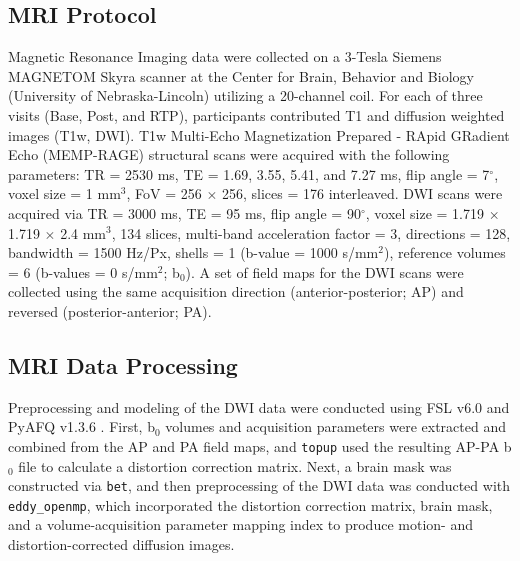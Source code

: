 \documentclass[12pt]{article}
\begin{document}


\subsection{MRI Protocol}
\label{ssec:meth-mri}
Magnetic Resonance Imaging data were collected on a 3-Tesla Siemens MAGNETOM Skyra scanner at the Center for Brain, Behavior and Biology (University of Nebraska-Lincoln) utilizing a 20-channel coil. For each of three visits (Base, Post, and RTP), participants contributed T1 and diffusion weighted images (T1w, DWI). T1w Multi-Echo Magnetization Prepared - RApid GRadient Echo (MEMP-RAGE) structural scans were acquired with the following parameters: TR = 2530 ms, TE = 1.69, 3.55, 5.41, and 7.27 ms, flip angle = 7$^{\circ}$, voxel size = 1 mm$^3$, FoV = 256 $\times$ 256, slices = 176 interleaved. DWI scans were acquired via TR = 3000 ms, TE = 95 ms, flip angle = 90$^{\circ}$, voxel size = 1.719 $\times$ 1.719 $\times$ 2.4 mm$^3$, 134 slices, multi-band acceleration factor = 3, directions = 128, bandwidth = 1500 Hz/Px, shells = 1 (b-value = 1000 s/mm$^2$), reference volumes = 6 (b-values = 0 s/mm$^2$; b$_0$). A set of field maps for the DWI scans were collected using the same acquisition direction (anterior-posterior; AP) and reversed (posterior-anterior; PA).


\subsection{MRI Data Processing}
\label{ssec:meth-mri-proc}
Preprocessing and modeling of the DWI data were conducted using FSL v6.0 \parencite{jenkinson2012Fsl} and PyAFQ v1.3.6 \parencite{kruper2021EvaluatingReliabilityHuman,yeatman2012TractProfilesWhite}. First, b$_0$ volumes and acquisition parameters were extracted and combined from the AP and PA field maps, and \lstinline{topup} used the resulting AP-PA b$_0$ file to calculate a distortion correction matrix. Next, a brain mask was constructed via \lstinline{bet}, and then preprocessing of the DWI data was conducted with \lstinline{eddy_openmp}, which incorporated the distortion correction matrix, brain mask, and a volume-acquisition parameter mapping index to produce motion- and distortion-corrected diffusion images.
\end{document}
